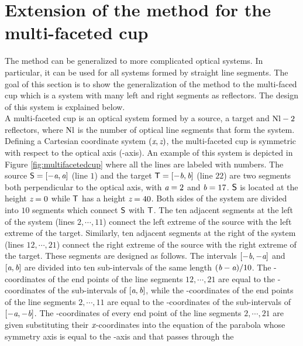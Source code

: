 \section{Extension of the method for the multi-faceted cup}
\label{sec:Generalization}
The method can be generalized to more complicated optical systems.
In particular, it can be used for all systems formed by straight line segments.
The goal of this section is to show the generalization of the method to the multi-faced cup which is a system with many left and right segments as reflectors.
The design of this system is explained below. \\ \indent
A multi-faceted cup is an optical system formed by a source, a target and $\textrm{Nl}-2$ reflectors, where $\textrm{Nl}$ is the number of optical line segments that form the system.
Defining a Cartesian coordinate system $(\textit{x}, \textit{z})$, the multi-faceted cup is symmetric with respect to the optical axis (-axis). An example of this system is depicted in Figure \ref{fig:multifacetedcup} where all the lines are labeled with numbers.
The source $\textsf{S}= [-\textit{a}, \textit{a}]$ (line $1$) and the target $\textsf{T}= [-\textit{b}, \textit{b}]$ (line $22$) are two segments both perpendicular to the optical axis, with $\textit{a}=2$ and $\textit{b}=17$.
$\textsf{S}$ is located at the height $\textit{z}=0$ while $\textsf{T}$ has a height $\textit{z}=40$.
Both sides of the system are divided into $10$ segments which connect $\textsf{S}$ with $\textsf{T}$.
The ten adjacent segments at the left of the system (lines $2, \cdots, 11$) connect the left extreme of the source with the left extreme of the target.
Similarly, ten adjacent segments at the right of the system (lines $12, \cdots, 21$) connect the right extreme of the source with the right extreme of the target.
These segments are designed as follows. The intervals $[-\textit{b}, -\textit{a}]$ and $[\textit{a}, \textit{b}]$ are divided into ten sub-intervals of the same length $(\textit{b}-\textit{a})/10$.
The -coordinates of the end points of the line segments $12, \cdots, 21$ are equal to the -coordinates of the sub-intervals of $[\textit{a},\textit{b}]$, while the -coordinates of the end points of the line segments $2, \cdots, 11$ are equal to the -coordinates of the sub-intervals of $[-\textit{a},-\textit{b}]$.
The -coordinates of every end point of the line segments $2, \cdots, 21$  are given substituting their $\textit{x}$-coordinates into the equation of the parabola whose symmetry axis is equal to the -axis and that passes through the
